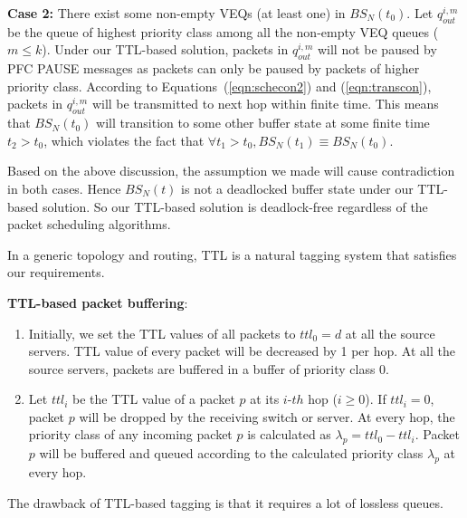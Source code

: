 \textbf{Case 2:} There exist some non-empty VEQs (at least one) in $BS_N(t_0)$. Let $q_{out}^{i,m}$ be the queue of highest priority class among all the non-empty VEQ queues ($m\leq k$). Under our TTL-based solution, packets in $q_{out}^{i,m}$ will not be paused by PFC PAUSE messages as packets can only be paused by packets of higher priority class. According to Equations~(\ref{eqn:schecon2}) and (\ref{eqn:transcon}), packets in $q_{out}^{i,m}$ will be transmitted to next hop within finite time. This means that $BS_N(t_0)$ will transition to some other buffer state  at some finite time $t_2>t_0$, which violates the fact that $\forall t_1>t_0, BS_N(t_1)\equiv BS_N(t_0)$.

Based on the above discussion, the assumption we made will cause contradiction in both cases. Hence $BS_N(t)$ is not a deadlocked buffer state under our TTL-based solution. So our TTL-based solution is deadlock-free regardless of the packet scheduling algorithms.


 In a generic topology and routing, TTL is a natural tagging system that satisfies our requirements.


\textbf{TTL-based packet buffering}: 
\begin{enumerate}
	\item  Initially, we set the TTL values of all packets to $ttl_0=d$ at all the source servers. TTL value of every packet will be decreased by 1 per hop. At all the source servers, packets are buffered in a buffer of priority class $0$.
	
	\item Let $ttl_i$ be the TTL value of a packet $p$ at its $i$-$th$ hop ($i \geq 0$). If $ttl_i = 0$, packet $p$ will be dropped by the receiving switch or server. At every hop, the priority class of any incoming packet $p$ is calculated as $\lambda_p = ttl_0 - ttl_i $. Packet $p$ will be buffered and queued according to the calculated priority class $\lambda_p$ at every hop.
\end{enumerate}
  
The drawback of TTL-based tagging is that it requires a lot of lossless queues. 



